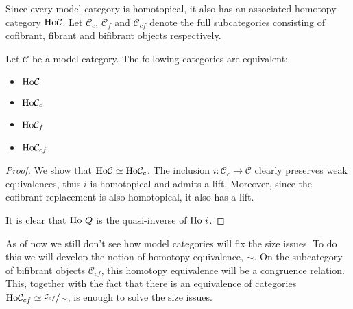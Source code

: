 \documentclass[../thesis.tex]{subfiles}
\begin{document}
            Since every model category is homotopical, it also has an associated homotopy category $\tt{Ho}\mathcal{C}$. Let $\mathcal{C}_c$, $\mathcal{C}_f$ and $\mathcal{C}_{cf}$ denote the full subcategories consisting of cofibrant, fibrant and bifibrant objects respectively.

            \begin{proposition}
                Let $\mathcal{C}$ be a model category. The following categories are equivalent:
                \begin{itemize}
                    \item $\tt{Ho}\mathcal{C}$
                    \item $\tt{Ho}\mathcal{C}_c$
                    \item $\tt{Ho}\mathcal{C}_f$
                    \item $\tt{Ho}\mathcal{C}_{cf}$
                \end{itemize}
            \end{proposition}

            \begin{proof}
                We show that $\tt{Ho}\mathcal{C} \simeq \tt{Ho}\mathcal{C}_c$. The inclusion $i:\mathcal{C}_c\rightarrow \mathcal{C}$ clearly preserves weak equivalences, thus $i$ is homotopical and admits a lift. Moreover, since the cofibrant replacement is also homotopical, it also has a lift.

                \begin{center}
                \end{center}

                It is clear that $\tt{Ho}\ Q$ is the quasi-inverse of $\tt{Ho}\ i$.
            \end{proof}

            As of now we still don't see how model categories will fix the size issues. To do this we will develop the notion of homotopy equivalence, $\sim$. On the subcategory of bifibrant objects $\mathcal{C}_{cf}$, this homotopy equivalence will be a congruence relation. This, together with the fact that there is an equivalence of categories $\tt{Ho}\mathcal{C}_{cf}\simeq \sfrac{\mathcal{C}_{cf}}{\sim}$, is enough to solve the size issues.
\end{document}
